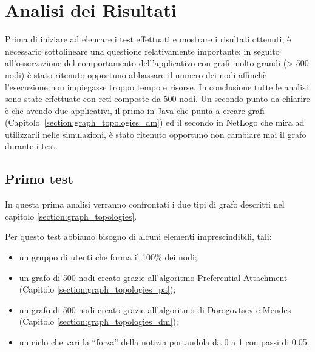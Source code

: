 \section{Analisi dei Risultati}
\label{section:analisirisultati}

Prima di iniziare ad elencare i test effettuati e mostrare i risultati ottenuti, è
necessario sottolineare una questione relativamente importante:
in seguito all'osservazione del comportamento dell'applicativo con grafi molto grandi (> 500 nodi) è stato ritenuto opportuno
abbassare il numero dei nodi affinchè l'esecuzione non impiegasse troppo tempo e risorse.
In conclusione tutte le analisi sono state effettuate con reti composte da 500 nodi.
Un secondo punto da chiarire è che avendo due applicativi, 
il primo in Java che punta a creare grafi (Capitolo~\ref{section:graph_topologies_dm}) 
ed il secondo in NetLogo che mira ad utilizzarli nelle simulazioni,
è stato ritenuto opportuno non cambiare mai il grafo durante i test.

\vspace*{-5pt}
\subsection{Primo test}
\label{section:first_test}

In questa prima analisi verranno confrontati i due tipi di grafo descritti nel capitolo \ref{section:graph_topologies}.

Per questo test abbiamo bisogno di alcuni elementi imprescindibili, tali:
\begin{itemize}
\vspace*{-3pt}
\item un gruppo di utenti che forma il 100\% dei nodi;
\item un grafo di 500 nodi creato grazie all'algoritmo Preferential Attachment (Capitolo \ref{section:graph_topologies_pa});
\item un grafo di 500 nodi creato grazie all'algoritmo di Dorogovtsev e Mendes (Capitolo \ref{section:graph_topologies_dm});
\item un ciclo che vari la ``forza'' della notizia portandola da 0 a 1 con passi di 0.05.
\end{itemize}


